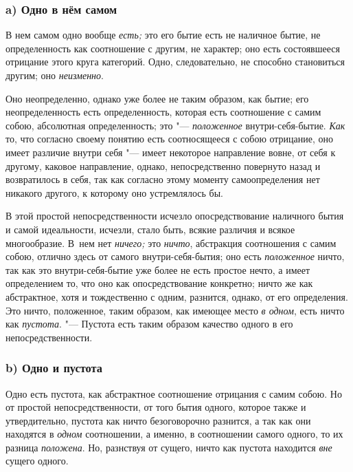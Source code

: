 \subsubsection[a) Одно в нём самом]{\centering a) Одно в нём самом}

В нем самом одно вообще {\em есть;} это его бытие есть
не наличное бытие, не определенность как соотношение с другим, не характер;
оно есть состоявшееся отрицание этого круга категорий. Одно, следовательно,
не способно становиться другим; оно {\em неизменно}.

Оно неопределенно, однако уже более не таким образом, как бытие; его
неопределенность есть определенность, которая есть соотношение с самим
собою, абсолютная определенность; это
"--- {\em положенное} внутри-себя-бытие.
{\em Как} то, что согласно своему понятию есть
соотносящееся с собою отрицание, оно имеет различие внутри себя "--- имеет
некоторое направление вовне, от себя к другому, каковое направление,
однако, непосредственно повернуто назад и возвратилось в себя, так как
согласно этому моменту самоопределения нет никакого другого, к которому оно
устремлялось бы.

В этой простой непосредственности исчезло опосредствование наличного бытия и
самой идеальности, исчезли, стало быть, всякие различия и всякое
многообразие. В~нем нет {\em ничего;} это
{\em ничто}, абстракция соотношения с самим собою,
отлично здесь от самого внутри-себя-бытия; оно есть
{\em положенное} ничто, так как это внутри-себя-бытие
уже более не есть простое нечто, а имеет определением то, что оно как
опосредствование конкретно; ничто же как абстрактное, хотя и тождественно с
одним, разнится, однако, от его определения. Это ничто, положенное, таким
образом, как имеющее место {\em в одном}, есть ничто
как {\em пустота}. "--- Пустота есть таким образом
качество одного в его непосредственности.

\subsubsection[b) Одно и пустота]{\centering b) Одно и пустота}

Одно есть пустота, как абстрактное соотношение отрицания с самим собою. Но
от простой непосредственности, от того бытия одного, которое также и
утвердительно, пустота как ничто безоговорочно разнится, а так как они
находятся в {\em одном} соотношении, а именно, в
соотношении самого одного, то их разница
{\em положена}. Но, разнствуя от сущего, ничто как
пустота находится {\em вне} сущего одного.

